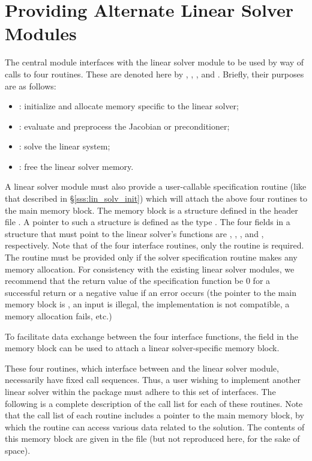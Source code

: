 \chapter{Providing Alternate Linear Solver Modules}\label{s:new_linsolv}
The central {\kinsol} module interfaces with the linear solver module 
to be used by way of calls to four routines.  These are denoted here by 
, , , and .
Briefly, their purposes are as follows:
\begin{itemize}
\item {}: initialize and allocate memory specific to the
  linear solver;
\item {}: evaluate and preprocess the Jacobian or preconditioner;
\item {}: solve the linear system;
\item {}: free the linear solver memory.
\end{itemize}
A linear solver module must also provide a user-callable specification
routine (like that described in \S\ref{sss:lin_solv_init}) which will
attach the above four routines to the main {\kinsol} memory block.
The {\kinsol} memory block is a structure defined in the header file
. A pointer to such a structure is defined as the
type . The four fields in a  structure that
must point to the linear solver's functions are ,
, , and , respectively.
Note that of the four interface routines, only the  routine
is required. The  routine must be provided only if the solver
specification routine makes any memory allocation.
For consistency with the existing {\kinsol} linear solver modules, we
recommend that the return value of the specification function be $0$ for
a successful return or a negative value if an error occurs (the
pointer to the main {\kinsol} memory block is , an input is
illegal, the {\nvector} implementation is not compatible, a memory
allocation fails, etc.)

To facilitate data exchange between the four interface functions, the
field  in the {\kinsol} memory block can be used to attach
a linear solver-specific memory block.

These four routines, which interface between {\kinsol} and the linear solver module,
necessarily have fixed call sequences.  Thus, a user wishing to implement another 
linear solver within the {\kinsol} package must adhere to this set of interfaces.
The following is a complete description of the call list for each of
these routines.  Note that the call list of each routine includes a
pointer to the main {\kinsol} memory block, by which the routine can access
various data related to the {\kinsol} solution.  The contents of this memory
block are given in the file  (but not reproduced here, for
the sake of space).

